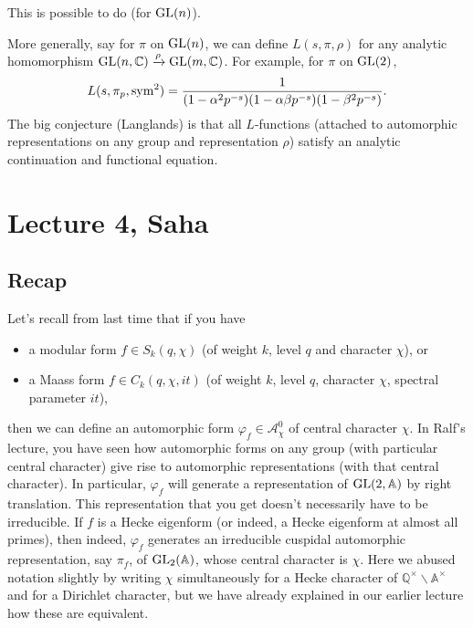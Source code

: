 \documentclass[reqno]{amsart} 
\begin{document}
\begin{theorem}
  This is possible to do (for $\operatorname{GL}(n)$).
\end{theorem}

More generally, say for $\pi$ on $\operatorname{GL}(n)$, we can define $L(s, \pi, \rho)$ for any analytic homomorphism $\operatorname{GL}(n, \mathbb{C}) \xrightarrow{\rho} \operatorname{GL}(m, \mathbb{C})$.  For example, for $\pi$ on $\operatorname{GL}(2)$,
\begin{equation*}
  L(s, \pi_p, \operatorname{sym}^2) = \frac{1}{(1 - \alpha^2 p^{- s})(1 - \alpha \beta p^{- s})(1 - \beta^2 p^{- s})}.
\end{equation*}
The big conjecture (Langlands) is that all $L$-functions (attached to automorphic representations on any group and representation $\rho$) satisfy an analytic continuation and functional equation.

\section{Lecture 4, Saha}

\subsection{Recap}

Let's recall from last time that if you have
\begin{itemize}
\item a modular form $f \in S_k(q, \chi)$ (of weight $k$, level $q$ and character $\chi$), or
\item a Maass form $f \in C_k(q, \chi, i t)$ (of weight $k$, level $q$, character $\chi$, spectral parameter $i t$),
\end{itemize}
then we can define an automorphic form $\varphi_f \in \mathcal{A}_\chi^0$ of central character $\chi$.  In Ralf's lecture, you have seen how automorphic forms on any group (with particular central character) give rise to automorphic representations (with that central character).  In particular, $\varphi_f$ will generate a representation of $\operatorname{GL}(2, \mathbb{A})$ by right translation.  This representation that you get doesn't necessarily have to be irreducible.  If $f$ is a Hecke eigenform (or indeed, a Hecke eigenform at almost all primes), then indeed, $\varphi_f$ generates an irreducible cuspidal automorphic representation, say $\pi_f$, of $\operatorname{GL}_2(\mathbb{A})$, whose central character is $\chi$.  Here we abused notation slightly by writing $\chi$ simultaneously for a Hecke character of $\mathbb{Q}^\times \backslash \mathbb{A}^\times$ and for a Dirichlet character, but we have already explained in our earlier lecture how these are equivalent.
\end{document}
